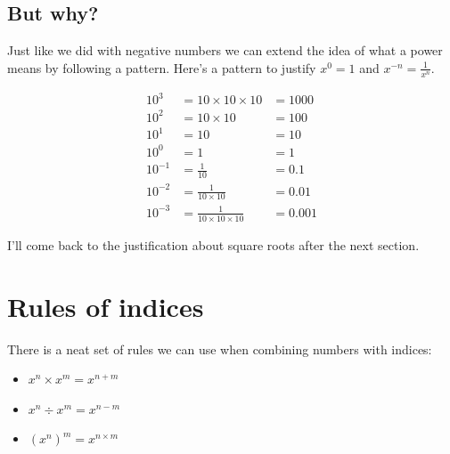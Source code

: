 \documentclass[
  a4paper,
]{scrbook}
\providecommand{\tightlist}{%
  \setlength{\itemsep}{0pt}\setlength{\parskip}{0pt}}\usepackage{longtable,booktabs,array}
\begin{document}
\hypertarget{but-why-1}{%
\subsection{But why?}\label{but-why-1}}

Just like we did with negative numbers we can extend the idea of what a
power means by following a pattern. Here's a pattern to justify
\(x^0 = 1\) and \(x^{-n} = \frac{1}{x^n}\).

\[
\begin{aligned} 10^3 &= 10 \times 10 \times 10 & = 1000 \\
10^2 &= 10 \times 10 & = 100 \\
10^1 &= 10 & = 10 \\
10^0 &= 1 & = 1 \\
10^{-1} &= \frac{1}{10} & = 0.1 \\
10^{-2} &= \frac{1}{10 \times 10} & = 0.01 \\
10^{-3} &= \frac{1}{10 \times 10 \times 10} & = 0.001 
\end{aligned}
\]

I'll come back to the justification about square roots after the next
section.

\hypertarget{rules-of-indices}{%
\section{Rules of indices}\label{rules-of-indices}}

There is a neat set of rules we can use when combining numbers with
indices:

\begin{tcolorbox}[enhanced jigsaw, opacityback=0, left=2mm, toptitle=1mm, title=\textcolor{quarto-callout-note-color}{\faInfo}\hspace{0.5em}{Note}, breakable, colbacktitle=quarto-callout-note-color!10!white, opacitybacktitle=0.6, bottomtitle=1mm, arc=.35mm, colback=white, leftrule=.75mm, bottomrule=.15mm, colframe=quarto-callout-note-color-frame, rightrule=.15mm, titlerule=0mm, toprule=.15mm, coltitle=black]

\begin{itemize}
\tightlist
\item
  \(x^n \times x^m = x^{n+m}\)
\item
  \(x^n \div x^m = x^{n-m}\)
\item
  \((x^n)^m = x^{n \times m}\)
\end{itemize}

\end{tcolorbox}
\end{document}
